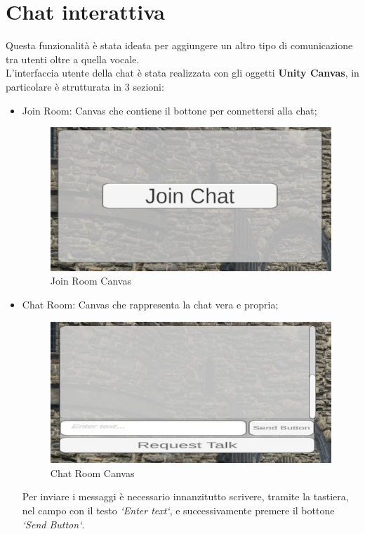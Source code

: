 \section{Chat interattiva}
Questa funzionalità è stata ideata per aggiungere un altro tipo di comunicazione tra utenti oltre a quella vocale.
\\L'interfaccia utente della chat è stata realizzata con gli oggetti \textbf{Unity Canvas}, in particolare è strutturata in 3 sezioni:
\begin{itemize}
    \item Join Room: Canvas che contiene il bottone per connettersi alla chat;
    \begin{figure}[H]
    \centering
    \includegraphics[scale = 0.65]{Immagini/ChatBackground.jpg}
    \caption{Join Room Canvas}
    \label{fig:my_label}
    \end{figure}
    \newpage\item Chat Room: Canvas che rappresenta la chat vera e propria;
        \begin{figure}[H]
    \centering
    \includegraphics[scale = 1]{Immagini/ChatRoom.jpg}
    \caption{Chat Room Canvas}
    \label{fig:my_label}
\end{figure}
    Per inviare i messaggi è necessario innanzitutto scrivere, tramite la tastiera, nel campo con il testo \textit{`Enter text`}, e successivamente premere il bottone \textit{`Send Button`}.

\end{itemize}
